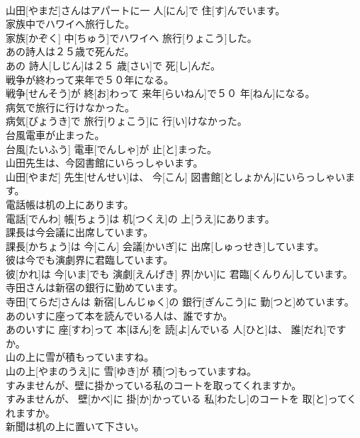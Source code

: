 \documentclass[8pt]{extreport}
\begin{document}
\begin{CJK}{UTF8}{min}
\\	山田[やまだ]さんはアパートに一 人[にん]で 住[す]んでいます。	
\\	家族中でハワイへ旅行した。	
\\	家族[かぞく] 中[ちゅう]でハワイへ 旅行[りょこう]した。	
\\	あの詩人は２５歳で死んだ。	
\\	あの 詩人[しじん]は２５ 歳[さい]で 死[し]んだ。	
\\	戦争が終わって来年で５０年になる。	
\\	戦争[せんそう]が 終[お]わって 来年[らいねん]で５０ 年[ねん]になる。	
\\	病気で旅行に行けなかった。	
\\	病気[びょうき]で 旅行[りょこう]に 行[い]けなかった。	
\\	台風電車が止まった。	
\\	台風[たいふう] 電車[でんしゃ]が 止[と]まった。	
\\	山田先生は、今図書館にいらっしゃいます。	
\\	山田[やまだ] 先生[せんせい]は、 今[こん] 図書館[としょかん]にいらっしゃいます。	
\\	電話帳は机の上にあります。	
\\	電話[でんわ] 帳[ちょう]は 机[つくえ]の 上[うえ]にあります。	
\\	課長は今会議に出席しています。	
\\	課長[かちょう]は 今[こん] 会議[かいぎ]に 出席[しゅっせき]しています。	
\\	彼は今でも演劇界に君臨しています。	
\\	彼[かれ]は 今[いま]でも 演劇[えんげき] 界[かい]に 君臨[くんりん]しています。	
\\	寺田さんは新宿の銀行に勤めています。	
\\	寺田[てらだ]さんは 新宿[しんじゅく]の 銀行[ぎんこう]に 勤[つと]めています。	
\\	あのいすに座って本を読んでいる人は、誰ですか。	
\\	あのいすに 座[すわ]って 本[ほん]を 読[よ]んでいる 人[ひと]は、 誰[だれ]ですか。	
\\	山の上に雪が積もっていますね。	
\\	山の上[やまのうえ]に 雪[ゆき]が 積[つ]もっていますね。	
\\	すみませんが、壁に掛かっている私のコートを取ってくれますか。	
\\	すみませんが、 壁[かべ]に 掛[か]かっている 私[わたし]のコートを 取[と]ってくれますか。	
\\	新聞は机の上に置いて下さい。	

\end{CJK}
\end{document}
